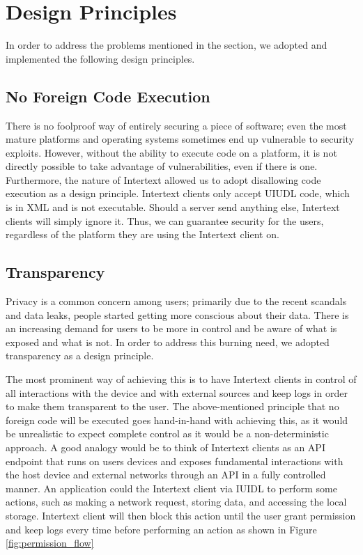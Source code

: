 \section{Design Principles} \label{designPrinciples}

In order to address the problems mentioned in the  section, we adopted and implemented the following design principles.

\subsection{No Foreign Code Execution}

There is no foolproof way of entirely securing a piece of software; even the most mature platforms and operating systems sometimes end up vulnerable to security exploits. However, without the ability to execute code on a platform, it is not directly possible to take advantage of vulnerabilities, even if there is one. Furthermore, the nature of Intertext allowed us to adopt disallowing code execution as a design principle. Intertext clients only accept UIUDL code, which is in XML and is not executable. Should a server send anything else, Intertext clients will simply ignore it. Thus, we can guarantee security for the users, regardless of the platform they are using the Intertext client on.

\subsection{Transparency}

Privacy is a common concern among users; primarily due to the recent scandals and data leaks, people started getting more conscious about their data. There is an increasing demand for users to be more in control and be aware of what is exposed and what is not. In order to address this burning need, we adopted transparency as a design principle. 

The most prominent way of achieving this is to have Intertext clients in control of all interactions with the device and with external sources and keep logs in order to make them transparent to the user. The above-mentioned principle that no foreign code will be executed goes hand-in-hand with achieving this, as it would be unrealistic to expect complete control as it would be a non-deterministic approach. A good analogy would be to think of Intertext clients as an API endpoint that runs on users devices and exposes fundamental interactions with the host device and external networks through an API in a fully controlled manner. An application could  the Intertext client via IUIDL to perform some actions, such as making a network request, storing data, and accessing the local storage. Intertext client will then block this action until the user grant permission and keep logs every time before performing an action as shown in Figure \ref{fig:permission_flow}

